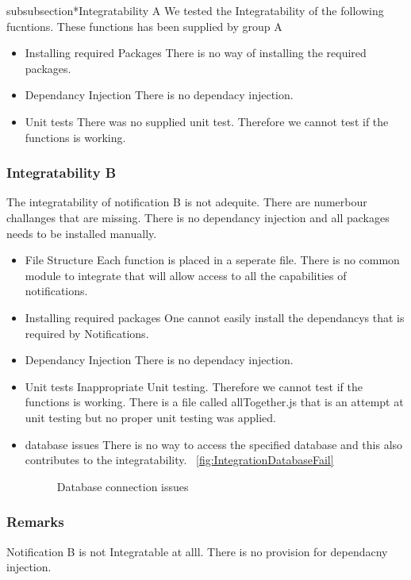 subsubsection*{Integratability A}
We tested the Integratability of the following fucntions. These functions has been supplied by group A
\begin{itemize}
	\item Installing required Packages
	There is no way of installing the required packages.
	\item Dependancy Injection
	There is no dependacy injection.
	\item Unit tests
	There was no supplied unit test. Therefore we cannot test if the functions is working.
\end{itemize}
\subsubsection*{Integratability B}
The integratability of notification B is not adequite. There are numerbour challanges that are missing. There is no dependancy injection and all packages needs to be installed manually.
\begin{itemize}
	\item {File Structure} 
	Each function is placed in a seperate file. There is no common module to integrate that will allow access to all the capabilities of notifications.
	\item Installing required packages
	One cannot easily install the dependancys that is required by Notifications.
	\item Dependancy Injection
	There is no dependacy injection.
	\item Unit tests
	Inappropriate Unit testing. Therefore we cannot test if the functions is working. There is a file called allTogether.js that is an attempt at unit testing but no proper unit testing was applied.
	\item database issues
	There is no way to access the specified database and this also contributes to the integratability. 
~\ref{fig:IntegrationDatabaseFail}
\begin{figure}[H]
	\centering
	\caption{Database connection issues}
	\label{fig:scope}
\end{figure}
\end{itemize}
\subsubsection*{Remarks}
Notification B is not Integratable at alll. There is no provision for dependacny injection.